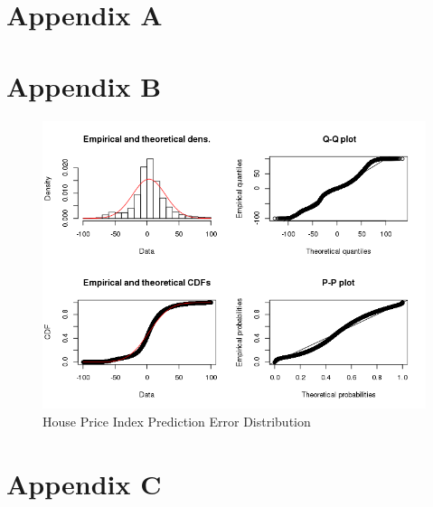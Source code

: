 \documentclass[AEJ,reqno, draftmode]{AEA} %
\begin{document}
\appendix

\section{Appendix A}

\renewcommand{\thetable}{A\arabic{table}}


\restoregeometry 



\restoregeometry 


\clearpage

\section{Appendix B}

\begin{figure}[!htb]
    \centering
     \includegraphics[width=\columnwidth]{Figures/HPI_predict_err.png} \par
 \caption{House Price Index Prediction Error Distribution}
 \label{fig:Rplot_ssd_err_10}
\end{figure}

%
\clearpage


\section{Appendix C}
\end{document}
